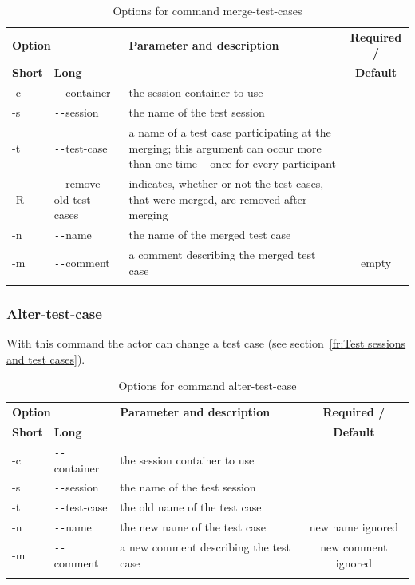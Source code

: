 \begin{longtable}{|l|l|p{61mm}|c|}\hline
   \multicolumn{2}{|l|}{\textbf{Option}} & 
   {\textbf{Parameter and description}} & 
   {\textbf{Required /}} \\
   {\textbf{Short}} &
   {\textbf{Long}} &
    & 
   {\textbf{Default}} \\\hline \hline \endhead
   -c & \verb$--$container & the session container to use & \x \\\hline
   -s & \verb$--$session & the name of the test session & \x \\\hline
   -t & \verb$--$test-case & a name of a test case participating at the merging; this argument can occur more than one time -- once for every participant & \x \\\hline
   -R & \verb$--$remove-old-test-cases & indicates, whether or not the test cases, that were merged, are removed after merging & \\\hline
   -n & \verb$--$name & the name of the merged test case & \x \\\hline
   -m & \verb$--$comment & a comment describing the merged test case & empty \\\hline
  \caption{Options for command merge-test-cases}
  \label{fr_tb:Options for command merge-test-cases}
\end{longtable}

\subsubsection{Alter-test-case}
\begin{quote}
\end{quote}
\par
With this command the actor can change a test case (see section~\ref{fr:Test sessions and test cases}).

\begin{longtable}{|l|l|p{73mm}|c|}\hline
   \multicolumn{2}{|l|}{\textbf{Option}} & 
   {\textbf{Parameter and description}} & 
   {\textbf{Required /}} \\
   {\textbf{Short}} &
   {\textbf{Long}} &
    & 
   {\textbf{Default}} \\\hline \hline \endhead
   -c & \verb$--$container & the session container to use & \x \\\hline
   -s & \verb$--$session & the name of the test session & \x \\\hline
   -t & \verb$--$test-case & the old name of the test case & \x \\\hline
   -n & \verb$--$name & the new name of the test case & new name ignored \\\hline
   -m & \verb$--$comment & a new comment describing the test case & new comment ignored \\\hline
  \caption{Options for command alter-test-case}
  \label{fr_tb:Options for command alter-test-case}
\end{longtable}


